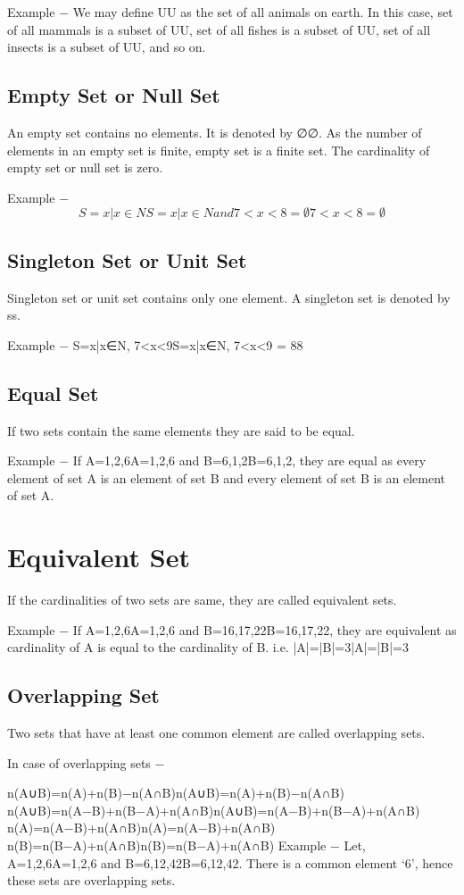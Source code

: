 Example − We may define UU as the set of all animals on earth. In this case, set of all mammals is a subset of UU, set of all fishes is a subset of UU, set of all insects is a subset of UU, and so on.

\subsection{Empty Set or Null Set}
An empty set contains no elements. It is denoted by ∅∅. As the number of elements in an empty set is finite, empty set is a finite set. The cardinality of empty set or null set is zero.

Example − \[S={x|x∈NS={x|x∈N and 7<x<8}=∅7<x<8}=∅\]
\subsection{Singleton Set or Unit Set}
Singleton set or unit set contains only one element. A singleton set is denoted by {s}{s}.

Example − S={x|x∈N, 7<x<9}S={x|x∈N, 7<x<9} = {8}{8}
\subsection{Equal Set}
If two sets contain the same elements they are said to be equal.

Example − If A={1,2,6}A={1,2,6} and B={6,1,2}B={6,1,2}, they are equal as every element of set A is an element of set B and every element of set B is an element of set A.

\section{Equivalent Set}
If the cardinalities of two sets are same, they are called equivalent sets.

Example − If A={1,2,6}A={1,2,6} and B={16,17,22}B={16,17,22}, they are equivalent as cardinality of A is equal to the cardinality of B. i.e. |A|=|B|=3|A|=|B|=3
\subsection{Overlapping Set}
Two sets that have at least one common element are called overlapping sets.

In case of overlapping sets −

n(A∪B)=n(A)+n(B)−n(A∩B)n(A∪B)=n(A)+n(B)−n(A∩B)
n(A∪B)=n(A−B)+n(B−A)+n(A∩B)n(A∪B)=n(A−B)+n(B−A)+n(A∩B)
n(A)=n(A−B)+n(A∩B)n(A)=n(A−B)+n(A∩B)
n(B)=n(B−A)+n(A∩B)n(B)=n(B−A)+n(A∩B)
Example − Let, A={1,2,6}A={1,2,6} and B={6,12,42}B={6,12,42}. There is a common element ‘6’, hence these sets are overlapping sets.

